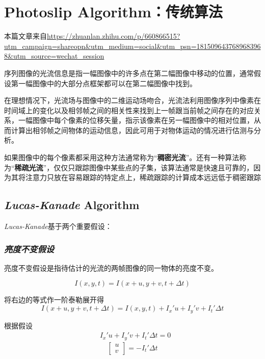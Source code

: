 \chapter{Photoslip Algorithm：传统算法}

本篇文章来自\url{https://zhuanlan.zhihu.com/p/660866515?utm_campaign=shareopn&utm_medium=social&utm_psn=1815096437689683968&utm_source=wechat_session}

\vspace*{2em}

序列图像的光流信息是指一幅图像中的许多点在第二幅图像中移动的位置，通常假设第一幅图像中的大部分点框架都可以在第二幅图像中找到。

在理想情况下，光流场与图像中的二维运动场吻合，光流法利用图像序列中像素在时间域上的变化以及相邻帧之间的相关性来找到上一帧跟当前帧之间存在的对应关系，一幅图像中每个像素的位移矢量，指示该像素在另一幅图像中的相对位置，从而计算出相邻帧之间物体的运动信息，因此可用于对物体运动的情况进行估测与分析。

如果图像中的每个像素都采用这种方法通常称为“\textbf{稠密光流}”。还有一种算法称为“\textbf{稀疏光流}”，仅仅只跟踪图像中某些点的子集，该算法通常是快速且可靠的，因为其将注意力只放在容易跟踪的特定点上，稀疏跟踪的计算成本远远低于稠密跟踪

\section{\textsl{Lucas-Kanade} Algorithm}

\textsl{Lucas-Kanade}基于两个重要假设：

\subsection*{\textsl{亮度不变假设}}

亮度不变假设是指待估计的光流的两帧图像的同一物体的亮度不变。

\begin{equation}
    I(x,y,t)=I(x+u, y+v,t+\Delta t)
\end{equation}

将右边的等式作一阶泰勒展开得
\begin{equation}
    I(x+u,y+v,t+\Delta t)=I(x,y,t)+I_x' u+I_y'v+I_t' \Delta t
\end{equation}

根据假设
\begin{equation}
    \begin{aligned}
        & I_x' u+I_y'v+I_t' \Delta t = 0 
    \end{aligned}
\end{equation}
\begin{equation}
    [I_x',I_y']\left[\begin{array}{c}
        u\\
        v
    \end{array}\right]=-I_t'\Delta t
\end{equation}

